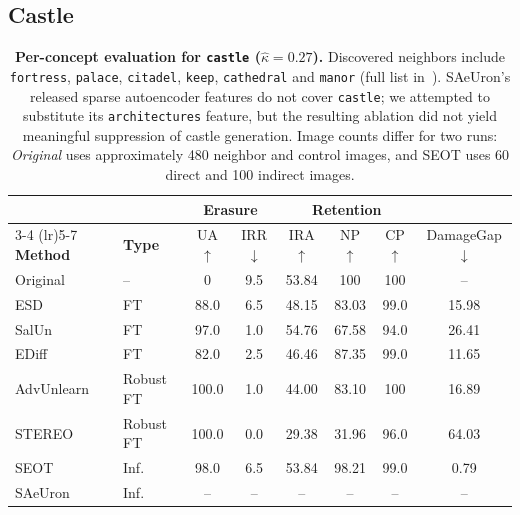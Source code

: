 \subsection{Castle}
\label{app:per_concept_castle}

\begin{table}[ht]
\centering
\small
\setlength{\tabcolsep}{5pt}
\begin{tabular}{llcccccc}
\toprule
& & \multicolumn{2}{c}{\textbf{Erasure}} & \multicolumn{3}{c}{\textbf{Retention}} & \\
\cmidrule(lr){3-4} \cmidrule(lr){5-7}
\textbf{Method} & \textbf{Type} & UA$\uparrow$ & IRR$\downarrow$ & IRA$\uparrow$ & NP$\uparrow$ & CP$\uparrow$ & DamageGap$\downarrow$ \\
\midrule
Original    & --          & 0     & 9.5   & 53.84 & 100   & 100   & --    \\
\midrule
ESD         & FT          & 88.0  & 6.5   & 48.15 & 83.03 & 99.0  & 15.98 \\
SalUn       & FT          & 97.0  & 1.0   & 54.76 & 67.58 & 94.0  & 26.41 \\
EDiff       & FT          & 82.0  & 2.5   & 46.46 & 87.35 & 99.0  & 11.65 \\
\midrule
AdvUnlearn  & Robust FT   & 100.0 & 1.0   & 44.00 & 83.10 & 100   & 16.89 \\
STEREO      & Robust FT   & 100.0 & 0.0   & 29.38 & 31.96 & 96.0  & 64.03 \\
\midrule
SEOT        & Inf.        & 98.0  & 6.5   & 53.84 & 98.21 & 99.0  & 0.79  \\
SAeUron     & Inf.        & --    & --    & --    & --    & --    & --    \\
\bottomrule
\end{tabular}
\caption{\textbf{Per-concept evaluation for \texttt{castle} ($\hat\kappa = 0.27$).} Discovered neighbors include 
\texttt{fortress}, \texttt{palace}, \texttt{citadel}, \texttt{keep}, \texttt{cathedral} and \texttt{manor} (full list in~). SAeUron's released sparse autoencoder features do not cover \texttt{castle}; we attempted to substitute its \texttt{architectures} feature, but the resulting ablation did not yield meaningful suppression of castle generation. Image counts differ for two runs: \emph{Original} uses approximately 480 neighbor and control images, and SEOT uses 60 direct and 100 indirect images.}
\label{tab:per_concept_castle}
\end{table}

